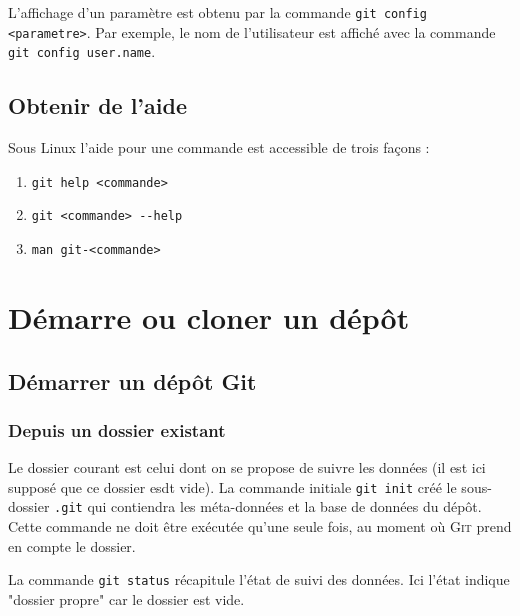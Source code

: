 \documentclass[11pt,twoside,headings=normal,open=right,french,DIV=12]{scrreprt}
\newcommand{\git}{\textsc{Git}}
\begin{document}
    L'affichage d'un paramètre est obtenu par la commande \verb|git config <parametre>|. Par exemple, le nom de
    l'utilisateur est affiché avec la commande \verb|git config user.name|.



\section{Obtenir de l'aide}



    Sous Linux l'aide pour une commande est accessible de trois façons :
    \begin{enumerate}
        \item \verb|git help <commande>|
        \item \verb|git <commande> --help|
        \item \verb|man git-<commande>|
    \end{enumerate}



\chapter{Démarre ou cloner un dépôt}



\section{Démarrer un dépôt Git}



\subsection{Depuis un dossier existant}
\label{sec-dossier_existant}


    Le dossier courant est celui dont on se propose de suivre les données (il est ici supposé que ce dossier esdt vide). La commande initiale \verb|git init|
    créé le sous-dossier \verb|.git| qui contiendra les méta-données et la base de données du dépôt. Cette
    commande ne doit être exécutée qu'une seule fois, au moment où \git{} prend en compte le dossier.
    
    \smallskip
    
    La commande \verb|git status| récapitule l'état de suivi des données. Ici l'état indique "dossier propre"
    car le dossier est vide.
    
    \smallskip
    
\end{document}
